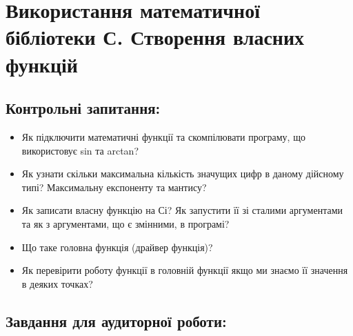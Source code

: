\documentclass[a5paper,titlepage,openany,twoside,draft]{book_unv}%
\begin{document}
\chapter{ Використання математичної бібліотеки С. Створення власних функцій }
%

\section{Контрольні запитання:}

\begin{itemize}
\item
  Як підключити математичні функції та скомпілювати програму, що
  використовує sin та arctan?

\item
  Як узнати скільки максимальна кількість значущих цифр в даному
  дійсному типі? Максимальну експоненту та мантису?

\item
  Як записати власну функцію на Сі? Як запустити її зі сталими
  аргументами та як з аргументами, що є змінними, в програмі?

\item
  Що таке головна функція (драйвер функція)?

\item
  Як перевірити роботу функції в головній функції якщо ми знаємо 
її значення в деяких точках? 

\end{itemize}

\section{Завдання для аудиторної роботи:}
\end{document}
